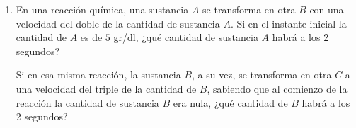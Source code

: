 \documentclass[a4paper,titlepage]{article}
\theoremstyle{solution}
\begin{document}
\begin{enumerate}[resume, leftmargin=*]
\item En una reacción química, una sustancia $A$ se transforma en otra $B$ con una velocidad del doble de la cantidad de
sustancia $A$.
Si en el instante inicial la cantidad de $A$ es de $5$ gr/dl, ¿qué cantidad de sustancia $A$ habrá a los 2 segundos? 

Si en esa misma reacción, la sustancia $B$, a su vez, se transforma en otra $C$ a una velocidad del triple de la
cantidad de $B$, sabiendo que al comienzo de la reacción la cantidad de sustancia $B$ era nula, ¿qué cantidad de $B$
habrá a los 2 segundos?
\end{enumerate}
\end{document}
